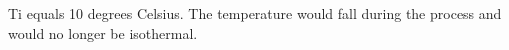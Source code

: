 Ti equals 10 degrees Celsius.  
The temperature would fall during the process and would no longer be isothermal.